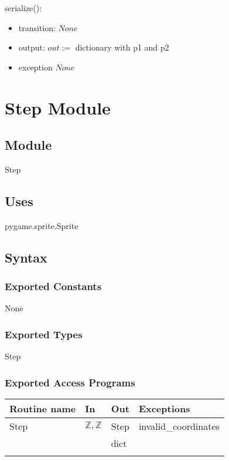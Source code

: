 \documentclass[12pt]{article}
\begin{document}
\color{red}
\noindent serialize():
\begin{itemize}
\item transition: $None$
\item output: $out := $ dictionary with p1 and p2
\item exception $ None $
\end{itemize}
\color{black}

\newpage

\section* {Step Module}

\subsection*{Module}

Step

\subsection* {Uses}

pygame.sprite.Sprite

\subsection* {Syntax}

\subsubsection* {Exported Constants}

None

\subsubsection* {Exported Types}

Step

\subsubsection* {Exported Access Programs}

\begin{tabular}{| l | l | l | l |}
\hline
\textbf{Routine name} & \textbf{In} & \textbf{Out} & \textbf{Exceptions}\\
\hline
Step &$\mathbb{Z}, \mathbb{Z}$ & Step & invalid\_coordinates\\
\hline
\textcolor{red}{serialize & & dict & \\}
\end{tabular}
\end{document}
